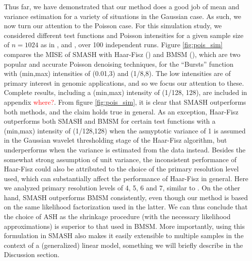 \documentclass[12pt]{article}
\begin{document}
Thus far, we have demonstrated that our method does a good job of mean and variance estimation for a variety of situations in the Gaussian case. As such, we now turn our attention to the Poisson case. For this simulation study, we considered different test functions and Poisson intensities for a given sample size of $n=1024$ as in \cite{Timmermann1999Multiscale}, \cite{Fryzlewicz2004HaarFisz} and \cite{Besbeas2004Comparative}, over 100 independent runs. Figure \ref{fig:pois_sim} compares the MISE of SMASH with Haar-Fisz (\cite{Fryzlewicz2004HaarFisz}) and BMSM (\cite{Kolaczyk1999Bayesian}), which are two popular and accurate Poisson denoising techniques, for the ``Bursts'' function with (min,max) intensities of (0.01,3) and (1/8,8). The low intensities are of primary interest in genomic applications, and so we focus our attention to these. Complete results, including a (min,max) intensity of (1/128, 128), are included in appendix \textcolor{red}{where?}. From figure \ref{fig:pois_sim}, it is clear that SMASH outperforms both methods, and the claim holds true in general. As an exception, Haar-Fisz outperforms both SMASH and BMSM for certain test functions with a (min,max) intensity of (1/128,128) when the asmyptotic variance of 1 is assumed in the Gaussian wavelet thresholding stage of the Haar-Fisz algorithm, but underperforms when the variance is estimated from the data instead. Besides the somewhat strong assumption of unit variance, the inconsistent performance of Haar-Fisz could also be attributed to the choice of the primary resolution level used, which can substantially affect the performance of Haar-Fisz in general. Here we analyzed primary resolution levels of 4, 5, 6 and 7, similar to \cite{Besbeas2004Comparative}. On the other hand, SMASH outperforms BMSM consistently, even though our method is based on the same likelihood factorization used in the latter. We can thus conclude that the choice of ASH as the shrinkage procedure (with the necessary likelihood approximations) is superior to that used in BMSM. More importantly, using this formulation in SMASH also makes it easily extensible to multiple samples in the context of a (generalized) linear model, something we will briefly describe in the Discussion section.
\end{document}

